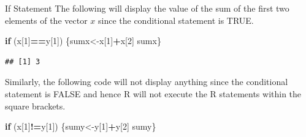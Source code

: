 \documentclass[
  ignorenonframetext,
]{beamer}
\newenvironment{Shaded}{\begin{snugshade}}{\end{snugshade}}
\newcommand{\ControlFlowTok}[1]{\textcolor[rgb]{0.13,0.29,0.53}{\textbf{#1}}}
\newcommand{\DecValTok}[1]{\textcolor[rgb]{0.00,0.00,0.81}{#1}}
\newcommand{\NormalTok}[1]{#1}
\newcommand{\OtherTok}[1]{\textcolor[rgb]{0.56,0.35,0.01}{#1}}
\newcommand{\SpecialCharTok}[1]{\textcolor[rgb]{0.81,0.36,0.00}{\textbf{#1}}}
\begin{document}
\begin{frame}[fragile]{If Statement}
\protect\hypertarget{if-statement}{}
The following will display the value of the sum of the first two
elements of the vector \(x\) since the conditional statement is TRUE.

\small

\begin{Shaded}
\begin{Highlighting}[]
\ControlFlowTok{if}\NormalTok{ (x[}\DecValTok{1}\NormalTok{]}\SpecialCharTok{==}\NormalTok{y[}\DecValTok{1}\NormalTok{])}
\NormalTok{\{sumx}\OtherTok{\textless{}{-}}\NormalTok{x[}\DecValTok{1}\NormalTok{]}\SpecialCharTok{+}\NormalTok{x[}\DecValTok{2}\NormalTok{]}
\NormalTok{  sumx\}}
\end{Highlighting}
\end{Shaded}

\begin{verbatim}
## [1] 3
\end{verbatim}

\normalsize

Similarly, the following code will not display anything since the
conditional statement is FALSE and hence R will not execute the R
statements within the square brackets.

\small

\begin{Shaded}
\begin{Highlighting}[]
\ControlFlowTok{if}\NormalTok{ (x[}\DecValTok{1}\NormalTok{]}\SpecialCharTok{!=}\NormalTok{y[}\DecValTok{1}\NormalTok{])}
\NormalTok{\{sumy}\OtherTok{\textless{}{-}}\NormalTok{y[}\DecValTok{1}\NormalTok{]}\SpecialCharTok{+}\NormalTok{y[}\DecValTok{2}\NormalTok{]}
\NormalTok{sumy\}}
\end{Highlighting}
\end{Shaded}

\normalsize
\end{frame}
\end{document}
